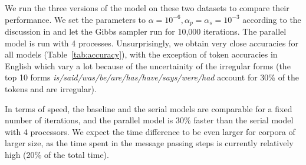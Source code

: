 We run the three versions of the model on these two datasets to compare their performance. We set the parameters to $\alpha = 10^{-6}, \alpha_p = \alpha_s = 10^{-3}$ according to the discussion in \cite{goldwater2011} and let the Gibbs sampler run for 10,000 iterations. The parallel model is run with 4 processes. Unsurprisingly, we obtain very close accuracies for all models (Table~\ref{tab:accuracy}), with the exception of token accuracies in English which vary a lot because of the uncertainity of the irregular forms (the top 10 forms \textit{is/said/was/be/are/has/have/says/were/had} account for 30\% of the tokens and are irregular).

In terms of speed, the baseline and the serial models are comparable for a fixed number of iterations, and the parallel model is 30\% faster than the serial model with 4 processors. We expect the time difference to be even larger for corpora of larger size, as the time spent in the message passing steps is currently relatively high (20\% of the total time).

